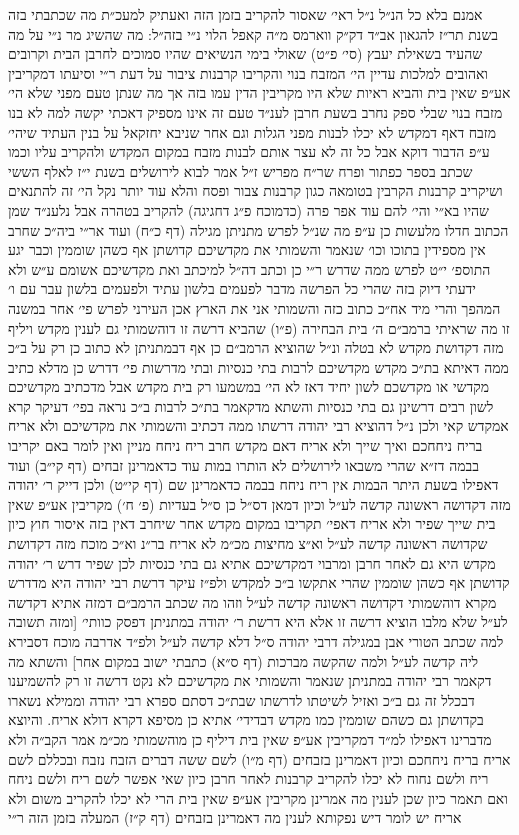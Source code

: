 \documentclass[12pt, openany]{book}
\begin{document}
\begin{multicols}{2}
אמנם בלא כל הנ״ל נ״ל ראי׳ שאסור להקריב בזמן הזה ואעתיק למעכ״ת מה שכתבתי בזה בשנת תר״ז להגאון אב״ד דק״ק ווארמס מ״ה קאפל הלוי נ״י בזה״ל: מה שהשיג מר נ״י על מה שהעיד בשאילת יעבץ (סי׳ פ״ט) שאולי בימי הנשיאים שהיו סמוכים לחרבן הבית וקרובים ואהובים למלכות עדיין הי׳ המזבח בנוי והקריבו קרבנות ציבור על דעת ר״י וסיעתו דמקריבין אע״פ שאין בית והביא ראיות שלא היו מקריבין הדין עמו בזה אך מה שנתן טעם מפני שלא הי׳ מזבח בנוי שבלי ספק נחרב בשעת חרבן לענ״ד טעם זה אינו מספיק דאכתי יקשה למה לא בנו מזבח דאף דמקדש לא יכלו לבנות מפני הגלות וגם אחר שניבא יחזקאל על בנין העתיד שיהי׳ ע״פ הדבור דוקא אבל כל זה לא עצר אותם לבנות מזבח במקום המקדש ולהקריב עליו וכמו שכתב בספר כפתור ופרח שר״ח מפריש ז״ל אמר לבוא לירושלים בשנת י״ז לאלף הששי ושיקריב קרבנות הקרבין בטומאה כגון קרבנות צבור ופסח והלא עוד יותר נקל הי׳ זה להתנאים שהיו בא״י והי׳ להם עוד אפר פרה (כדמוכח פ״ג דחגיגה) להקריב בטהרה אבל נלענ״ד שמן הכתוב חדלו מלעשות כן ע״פ מה שנ״ל לפרש מתניתן מגילה (דף כ״ח) ועוד אר״י ביה״כ שחרב אין מספידין בתוכו וכו׳ שנאמר והשמותי את מקדשיכם קדושתן אף כשהן שוממין וכבר יגע התוספ׳ י״ט לפרש ממה שדרש ר״י כן וכתב דה״ל למיכתב ואת מקדשיכם אשומם ע״ש ולא ידעתי דיוק בזה שהרי כל הפרשה מדבר לפעמים בלשון עתיד ולפעמים בלשון עבר עם ו׳ המהפך והרי מיד אח״כ כתוב כזה והשמותי אני את הארץ אכן העירני לפרש פי׳ אחר במשנה זו מה שראיתי ברמב״ם ה׳ בית הבחירה (פ״ו) שהביא דרשה זו דוהשמותי גם לענין מקדש ויליף מזה דקדושת מקדש לא בטלה ונ״ל שהוציא הרמב״ם כן אף דבמתניתן לא כתוב כן רק על ב״כ ממה דאיתא בת״כ מקדש מקדשיכם לרבות בתי כנסיות ובתי מדרשות פי׳ דדרש כן מדלא כתיב מקדשי או מקדשכם לשון יחיד דאז לא הי׳ במשמעו רק בית מקדש אבל מדכתיב מקדשיכם לשון רבים דרשינן גם בתי כנסיות והשתא מדקאמר בת״כ לרבות ב״כ נראה בפי׳ דעיקר קרא אמקדש קאי ולכן נ״ל דהוציא רבי יהודה דרשתו ממה דכתיב והשמותי את מקדשיכם ולא אריח בריח ניחחכם ואיך שייך ולא אריח דאם מקדש חרב ריח ניחח מניין ואין לומר באם יקריבו בבמה דז״א שהרי משבאו לירושלים לא הותרו במות עוד כדאמרינן זבחים (דף קי״ב) ועוד דאפילו בשעת היתר הבמות אין ריח ניחח בבמה כדאמרינן שם (דף קי״ט) ולכן דייק ר׳ יהודה מזה דקדושה ראשונה קדשה לע״ל וכיון דמאן דס״ל כן ס״ל בעדיות (פ׳ ח׳) מקריבין אע״פ שאין בית שייך שפיר ולא אריח דאפי׳ תקריבו במקום מקדש אחר שיחרב דאין בזה איסור חוץ כיון שקדושה ראשונה קדשה לע״ל וא״צ מחיצות מכ״מ לא אריח בר״נ וא״כ מוכח מזה דקדושת מקדש היא גם לאחר חרבן ומרבוי דמקדשיכם אתיא גם בתי כנסיות לכן שפיר דרש ר׳ יהודה קדושתן אף כשהן שוממין שהרי אתקשו ב״כ למקדש ולפ״ז עיקר דרשת רבי יהודה היא מדדרש מקרא דוהשמותי דקדושה ראשונה קדשה לע״ל וזהו מה שכתב הרמב״ם דמזה אתיא דקדשה לע״ל שלא מלבו הוציא דרשה זו אלא היא דרשת ר׳ יהודה במתניתן דפסק כוותי׳ [ומזה תשובה למה שכתב הטורי אבן במגילה דרבי יהודה ס״ל דלא קדשה לע״ל ולפ״ד אדרבה מוכח דסבירא ליה קדשה לע״ל ולמה שהקשה מברכות (דף ס״א) כתבתי ישוב במקום אחר] והשתא מה דקאמר רבי יהודה במתניתן שנאמר והשמותי את מקדשיכם לא נקט דרשה זו רק להשמיענו דבכלל זה גם ב״כ ואזיל לשיטתו לדרשתו שבת״כ דסתם ספרא רבי יהודה וממילא נשארו בקדושתן גם כשהם שוממין כמו מקדש דבדידי׳ אתיא כן מסיפא דקרא דולא אריח. והיוצא מדברינו דאפילו למ״ד דמקריבין אע״פ שאין בית דיליף כן מוהשמותי מכ״מ אמר הקב״ה ולא אריח בריח ניחחכם וכיון דאמרינן בזבחים (דף מ״ו) לשם ששה דברים הזבח נזבח ובכללם לשם ריח ולשם נחוח לא יכלו להקריב קרבנות לאחר חרבן כיון שאי אפשר לשם ריח ולשם ניחח ואם תאמר כיון שכן לענין מה אמרינן מקריבין אע״פ שאין בית הרי לא יכלו להקריב משום ולא אריח יש לומר דיש נפקותא לענין מה דאמרינן בזבחים (דף ק״ז) המעלה בזמן הזה ר״י 
\end{multicols}
\end{document}
